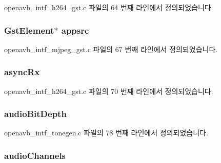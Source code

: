 openavb\+\_\+intf\+\_\+h264\+\_\+gst.\+c 파일의 64 번째 라인에서 정의되었습니다.

\subsubsection[{\texorpdfstring{appsrc}{appsrc}}]{\setlength{\rightskip}{0pt plus 5cm}Gst\+Element$\ast$ appsrc}\hypertarget{structpvt__data__t_a512e4f21f7a4f8ec5f1c52c6f1954348}{}\label{structpvt__data__t_a512e4f21f7a4f8ec5f1c52c6f1954348}


openavb\+\_\+intf\+\_\+mjpeg\+\_\+gst.\+c 파일의 67 번째 라인에서 정의되었습니다.

\subsubsection[{\texorpdfstring{async\+Rx}{asyncRx}}]{ async\+Rx}\hypertarget{structpvt__data__t_aa9728e7b327a4793c5732449b91c8fc6}{}\label{structpvt__data__t_aa9728e7b327a4793c5732449b91c8fc6}


openavb\+\_\+intf\+\_\+h264\+\_\+gst.\+c 파일의 70 번째 라인에서 정의되었습니다.

\subsubsection[{\texorpdfstring{audio\+Bit\+Depth}{audioBitDepth}}]{ audio\+Bit\+Depth}\hypertarget{structpvt__data__t_a868321a19830c5c46ed52c007dfdedb9}{}\label{structpvt__data__t_a868321a19830c5c46ed52c007dfdedb9}


openavb\+\_\+intf\+\_\+tonegen.\+c 파일의 78 번째 라인에서 정의되었습니다.

\subsubsection[{\texorpdfstring{audio\+Channels}{audioChannels}}]{ audio\+Channels}\hypertarget{structpvt__data__t_ad8a7767f3583795147d57c7252554dd9}{}\label{structpvt__data__t_ad8a7767f3583795147d57c7252554dd9}


